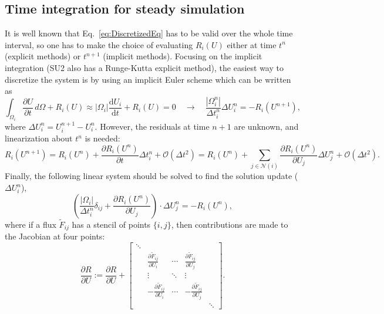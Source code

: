 \subsection*{Time integration for steady simulation}
It is well known that Eq.~\ref{eq:DiscretizedEq} has to be valid over the whole time interval, so one has to make the choice of evaluating $R_i(U)$ either at time $t^{n}$ (explicit methods) or $t^{n+1}$ (implicit methods). Focusing on the implicit integration (SU2 also has a Runge-Kutta explicit method), the easiest way to discretize the system is by using an implicit Euler scheme which can be written as
\begin{equation}
\int_{\Omega_i}{\frac{\partial{U}}{\partial{t}}}\,d\Omega + R_i(U) \approx |\Omega_i| \frac{\mathrm{d}U_i}{\mathrm{d}t} + R_i(U) = 0 \quad \rightarrow \quad \frac{|\Omega_i^n|}{\Delta t_i^n} \Delta U_i^n = - R_i(U^{n+1}),
\label{eq:Implicit_Euler}
\end{equation}
where $\Delta U_i^n = U_i^{n+1} - U_i^n$. However, the residuals at time $n+1$ are unknown, and linearization about $t^n$ is needed:
\begin{equation}
R_i(U^{n+1})  =  R_i(U^n) + \frac{\partial R_i (U^n)}{\partial t} \Delta t_i^n + \mathcal{O}(\Delta t^2) = R_i(U^n) + \sum_{j \in \mathcal{N}(i)} \frac{\partial R_i (U^n)}{\partial U_j} \Delta U_j^n + \mathcal{O}(\Delta t^2).
\end{equation}
Finally, the following linear system should be solved to find the solution update ($\Delta U_i^n$),
\begin{equation}\label{linear_system}
\left( \frac{|\Omega_i|}{\Delta t_i^n} \delta_{ij} + \frac{\partial R_i (U^n)}{\partial U_j} \right) \cdot \Delta U_j^n = -R_i(U^n),
\end{equation}
where if a flux $\tilde F_{ij}$ has a stencil of points $\{i, j\}$, then contributions are made to the Jacobian at four points:
\begin{equation}
\frac{\partial R}{\partial U} := \frac{\partial R}{\partial U} + \left[
\begin{array}{ccccc}
\ddots & & & & \\
 & \frac{\partial \tilde{F}_{ij}}{\partial U_i} & \cdots & \frac{\partial \tilde{F}_{ij}}{\partial U_j} & \\
 & \vdots & \ddots & \vdots & \\
 & -\frac{\partial \tilde{F}_{ij}}{\partial U_i} & \cdots & -\frac{\partial \tilde{F}_{ij}}{\partial U_j} & \\
 & & & & \ddots 
\end{array}
\right].
\end{equation}


